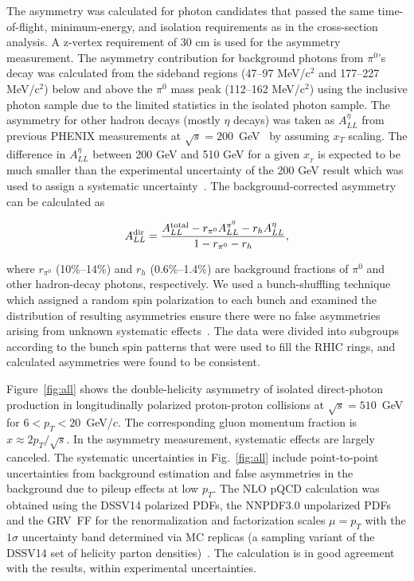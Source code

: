 \documentclass[twocolumn,letterpaper,aps,prl,longbibliography,superscriptaddress,floatfix]{revtex4-2}
\newcommand{\pT}{\mbox{$p_T$}\xspace}
\newcommand{\pizero}{\mbox{$\pi^0$}\xspace}
\begin{document}
The asymmetry was calculated for photon candidates that passed the same 
time-of-flight, minimum-energy, and isolation requirements as in the 
cross-section analysis. A z-vertex requirement of 30 cm is used for 
the asymmetry measurement. The asymmetry contribution for background 
photons from \pizero's decay was calculated from the sideband regions 
(47--97 MeV/c$^2$ and 177--227 MeV/c$^2$) below and above the \pizero 
mass peak (112--162 MeV/c$^2$) using the inclusive photon sample due to 
the limited statistics in the isolated photon sample. The asymmetry for 
other hadron decays (mostly $\eta$ decays) was taken as $A_{LL}^{\eta}$ 
from previous PHENIX measurements at 
$\sqrt{s}=200$~GeV~\cite{PhysRevD.90.012007} by assuming $x_T$ scaling. 
The difference in $A^{\eta}_{LL}$ between 200 GeV and 510 GeV for a 
given $x_{_{T}}$ is expected to be much smaller than the experimental 
uncertainty of the 200 GeV result which was used to assign a systematic 
uncertainty~\cite{PhysRevLett.113.012001, 2014276}. The 
background-corrected asymmetry can be calculated as

\begin{equation} \label{eq:all-dir}
A_{LL}^{{\rm dir}} = \frac{A_{LL}^{{\rm total}} - r_{\pi^0}A_{LL}^{\pi^0} -r_h A_{LL}^{\eta}}{1 - r_{\pi^0} - r_h},
\end{equation}

\noindent where $r_{\pi^0}$ (10\%--14\%) and $r_h$ (0.6\%--1.4\%) are background 
fractions of \pizero and other hadron-decay photons, respectively.
We used a bunch-shuffling 
technique which assigned a random spin polarization to 
each bunch and examined the distribution of resulting asymmetries
ensure there were no false asymmetries arising from 
unknown systematic effects~\cite{PhysRevD.90.012007}.
The data were divided into subgroups according to the 
bunch spin patterns that were used to fill the RHIC rings, and 
calculated asymmetries were found to be consistent.

Figure~\ref{fig:all} shows the double-helicity asymmetry of isolated 
direct-photon production in longitudinally polarized proton-proton 
collisions at $\sqrt{s}=510$~GeV for $6<p_T<20$~GeV/$c$.
The corresponding gluon momentum fraction is $x \approx 2p_T/\sqrt{s}$.
In the asymmetry  measurement, systematic effects are largely canceled.
The systematic uncertainties in Fig.~\ref{fig:all} include point-to-point
uncertainties from background estimation and false asymmetries in the
background due to pileup effects at low \pT.
The NLO pQCD calculation was obtained using the DSSV14 polarized PDFs,
the NNPDF3.0 unpolarized PDFs and the GRV~FF for the renormalization and factorization 
scales $\mu=p_T$ with the $1\sigma$ uncertainty band determined via MC replicas (a 
sampling variant of the DSSV14 set of helicity parton 
densities)~\cite{PhysRevLett.101.072001,PhysRevLett.113.012001, 
PhysRevD.100.114027}. The calculation is in good agreement with the 
results, within experimental uncertainties.
\end{document}

